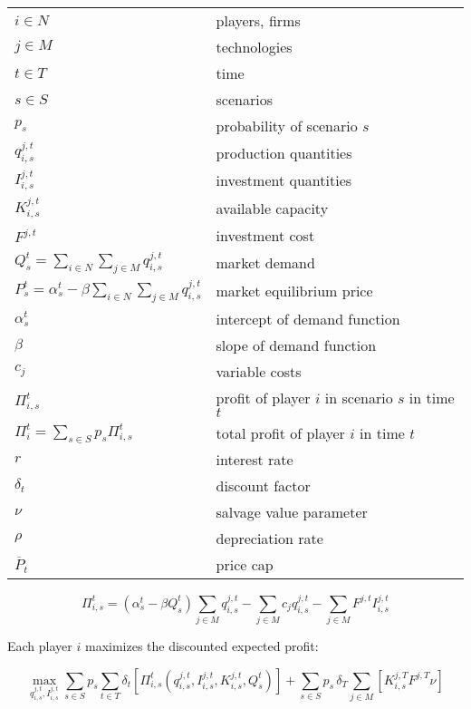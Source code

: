 \begin{longtable}[l]{l l}
$i \in N$ & players, firms \\
$j \in M$ & technologies \\
$t \in T$ & time \\
$s \in S$ & scenarios \\
$p_s$ & probability of scenario $s$\\
$ q_{i,s}^{j,t}$ & production quantities \\
$I_{i,s}^{j,t}$ & investment quantities \\
$K_{i,s}^{j,t}$ & available capacity\\
$F^{j,t}$ & investment cost\\
$Q_s^t = \sum_{i\in N}\sum_{j\in M} q_{i,s}^{j,t}$ & market demand \\
$P_s^t = \alpha_s^t-\beta\sum_{i\in N}\sum_{j\in M}q_{i,s}^{j,t}$ & market equilibrium price \\
$\alpha_s^t$ & intercept of demand function \\
$\beta$ & slope of demand function \\
$c_j$ & variable costs \\
$\Pi_{i,s}^t$ & profit of player $i$ in scenario $s$ in time $t$\\
$\Pi_i^t = \sum_{s\in S}p_s\Pi_{i,s}^t$ & total profit of player $i$ in time $t$\\
$r$ & interest rate \\
$\delta_t$ & discount factor \\
$\nu$ & salvage value parameter\\
$\rho$ & depreciation rate\\
$\overline{P}_t$ & price cap\\ 

\end{longtable}

\begin{equation}
\Pi_{i,s}^t = \left(\alpha_s^t-\beta Q_s^t \right)\sum_{j\in M}q_{i,s}^{j,t}-\sum_{j\in M}c_jq_{i,s}^{j,t}-\sum_{j\in M}F^{j,t}I_{i,s}^{j,t}
\end{equation}

Each player $i$ maximizes the discounted expected profit:

\begin{equation}
  \label{eq:objfct}
  \max_{q_{i,s}^{j,t}, I_{i,s}^{j,t}} \sum_{s\in S}p_s \sum_{t\in T}\delta_t \left[\Pi_{i,s}^t\left(q_{i,s}^{j,t}, I_{i,s}^{j,t}, K_{i,s}^{j,t}, Q_s^t\right) \right ]+ \sum_{s\in S}p_s\,\delta_T \sum_{j\in M}\left[K_{i,s}^{j,T}F^{j,T}\nu\right]
\end{equation}

